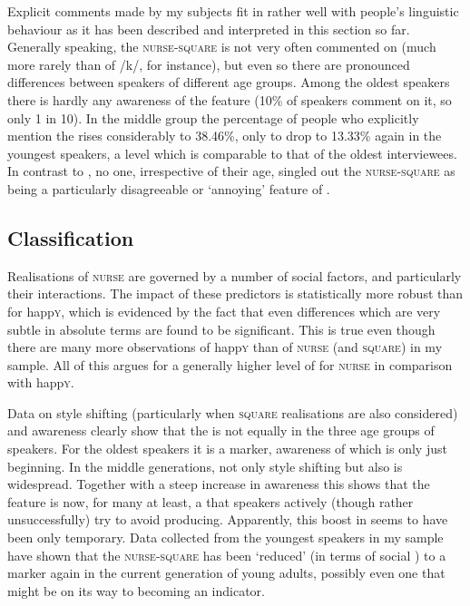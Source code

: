 Explicit comments made by my subjects fit in rather well with people's linguistic behaviour as it has been described and interpreted in this section so far.
Generally speaking, the \textsc{nurse}-\textsc{square}  is not very often commented on (much more rarely than  of /k/, for instance), but even so there are pronounced differences between speakers of different age groups.
Among the oldest speakers there is hardly any  awareness of the feature (10\% of speakers comment on it, so only 1 in 10).
In the middle group the percentage of people who explicitly mention the  rises considerably to 38.46\%, only to drop to 13.33\% again in the youngest speakers, a level which is comparable to that of the oldest interviewees.
In contrast to , no one, irrespective of their age, singled out the \textsc{nurse}-\textsc{square}  as being a particularly disagreeable or `annoying' feature of .

\subsection{Classification}

Realisations of \textsc{nurse} are governed by a number of social factors, and particularly their interactions.
The impact of these predictors is statistically more robust than for happ\textsc{y}, which is evidenced by the fact that even differences which are very subtle in absolute terms are found to be significant.
This is true even though there are many more observations of happ\textsc{y} than of \textsc{nurse} (and \textsc{square}) in my sample.
All of this argues for a generally higher level of  for \textsc{nurse} in comparison with happ\textsc{y}.

Data on style shifting (particularly when \textsc{square} realisations are also considered) and  awareness clearly show that the  is not equally  in the three age groups of speakers.
For the oldest speakers it is a marker, awareness of which is only just beginning.
In the middle generations, not only style shifting but also  is widespread.
Together with a steep increase in  awareness this shows that the feature is now, for many at least, a  that speakers actively (though rather unsuccessfully) try to avoid producing.
Apparently, this boost in  seems to have been only temporary.
Data collected from the youngest speakers in my sample have shown that the \textsc{nurse}-\textsc{square}  has been `reduced' (in terms of social ) to a marker again in the current generation of young adults, possibly even one that might be on its way to becoming an indicator.

